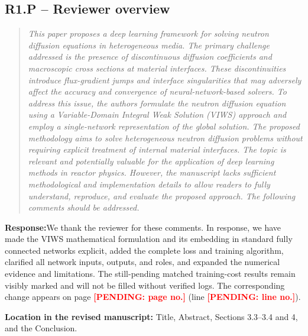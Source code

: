 \documentclass[11pt,a4paper]{article}
\newenvironment{reviewercomment}{\begin{quote}\small\itshape\color{commentgray}}{\end{quote}}
\newcommand{\authorresponse}{\noindent\textbf{Response:}\quad}
\newcommand{\revisionlocation}[1]{\par\noindent\textcolor{locationblue}{\textbf{Location in the revised manuscript: }}#1}
\newcommand{\draftplaceholder}[1]{\textcolor{red}{\textbf{[PENDING: #1]}}}
\begin{document}
\subsection*{R1.P -- Reviewer overview}
\begin{reviewercomment}
This paper proposes a deep learning framework for solving neutron diffusion equations in heterogeneous media. The primary challenge addressed is the presence of discontinuous diffusion coefficients and macroscopic cross sections at material interfaces. These discontinuities introduce flux-gradient jumps and interface singularities that may adversely affect the accuracy and convergence of neural-network-based solvers. To address this issue, the authors formulate the neutron diffusion equation using a Variable-Domain Integral Weak Solution (VIWS) approach and employ a single-network representation of the global solution. The proposed methodology aims to solve heterogeneous neutron diffusion problems without requiring explicit treatment of internal material interfaces. The topic is relevant and potentially valuable for the application of deep learning methods in reactor physics. However, the manuscript lacks sufficient methodological and implementation details to allow readers to fully understand, reproduce, and evaluate the proposed approach. The following comments should be addressed.
\end{reviewercomment}
\authorresponse We thank the reviewer for these comments. In response, we have made the VIWS mathematical formulation and its embedding in standard fully connected networks explicit, added the complete loss and training algorithm, clarified all network inputs, outputs, and roles, and expanded the numerical evidence and limitations. The still-pending matched training-cost results remain visibly marked and will not be filled without verified logs.
The corresponding change appears on page \draftplaceholder{page no.} (line \draftplaceholder{line no.}).
\revisionlocation{Title, Abstract, Sections 3.3--3.4 and 4, and the Conclusion.}
\end{document}
